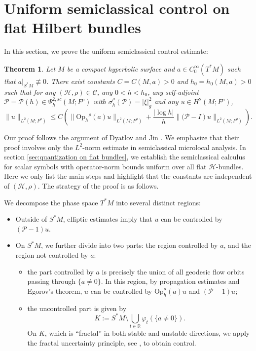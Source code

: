 \documentclass[11pt,oneside,reqno]{amsart}
\newcommand\Oph{\ensuremath{\mathrm{Op}_h}}
\newtheorem{theorem}{Theorem}[section]
\theoremstyle{definition}
\numberwithin{equation}{section}
\theoremstyle{plain}
\begin{document}
\section{Uniform semiclassical control on flat Hilbert bundles}\label{sec:uniform semiclassical control}

In this section, we prove the uniform semiclassical control estimate:

\begin{theorem}\label{generalizedmicrolocalcontrolonhilbertbundle}
Let $M$ be a compact hyperbolic surface and $a \in C_{0}^{\infty}(T^* M)$ such that $ a |_{S^* M} \not \equiv 0$. There exist constants $C=C(M,a)>0$ and $h_{0}  = h_0(M,a)>0$ such that for any $(\mathcal{H},\rho)\in \mathcal{C}$, any $0<h<h_{0}$, any self-adjoint $\mathcal{P}=\mathcal{P}(h)\in \Psi^{2,sc}_{h}(M;F^\rho)$ with $\sigma_{h}^{\rho}(\mathcal{P})=|\xi|_g^2$ and any $u \in H^2(M;F^{\rho})$,
\begin{equation}\label{generalizedmicrolocalcontrolonhilbertbundleq}
\|u\|_{L^2(M;F^{\rho})} \leq C\left( \|\Oph^{\rho}(a) u\|_{L^2(M;F^{\rho})}+\frac{|\log h|}{h}\left\|(\mathcal{P} -I\right) u\|_{L^2(M;F^{\rho})} \right).
\end{equation}
\end{theorem}


Our proof follows the argument of Dyatlov and Jin \cite[Theorem 2]{dyatlov2018semiclassical}. We emphasize that their proof involves only the $L^2$-norm estimate in semiclassical microlocal analysis. In section \ref{sec:quantization on flat bundles}, we establish the semiclassical calculus for scalar symbols with operator-norm bounds uniform over all flat $\mathcal{H}$-bundles. Here we only list the main steps and highlight that the constants are independent of $(\mathcal{H},\rho)$. The strategy of the proof is as follows.

We decompose the phase space $T^* M$ into several distinct regions:
\begin{itemize}
\item Outside of $S^* M$, elliptic estimates imply that $u$ can be controlled by $(\mathcal{P}-1) u$. 
\item On $S^*M$, we further divide into two parts: the region controlled by $a$, and the region not controlled by $a$:
\begin{itemize}
     \item the part controlled by $a$ is precisely the union of all geodesic flow orbits passing through $\{a \neq 0\}$. In this region, by propagation estimates and Egorov's theorem, $u$ can be controlled by $\mathrm{Op}_h^{\rho}(a) u$ and $(\mathcal{P}-1)u$;
\item the uncontrolled part is given by
\begin{equation*}
    K:=S^* M \setminus \bigcup_{t \in \mathbb{R}} \varphi_t(\{a \neq 0\}).
\end{equation*}
On $K$, which is ``fractal'' in both stable and unstable directions, we apply the fractal uncertainty principle, see \cite{dyatlov2018semiclassical}, to obtain control.
\end{itemize}
\end{itemize}
\end{document}
